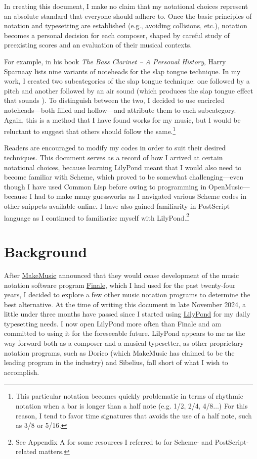 In creating this document, I make no claim that my notational choices represent an absolute standard that everyone should adhere to. Once the basic principles of notation and typesetting are established (e.g., avoiding collisions, etc.), notation becomes a personal decision for each composer, shaped by careful study of preexisting scores and an evaluation of their musical contexts. 

For example, in his book \textit{The Bass Clarinet – A Personal History}, Harry Sparnaay lists nine variants of noteheads for the slap tongue technique.\autocite[66]{HS2012} In my work, I created two subcategories of the slap tongue technique: one followed by a pitch and another followed by an air sound (which produces the slap tongue effect that sounds ). To distinguish between the two, I decided to use encircled noteheads—both filled and hollow—and attribute them to each subcategory. Again, this is a method that I have found works for my music, but I would be reluctant to suggest that others should follow the same.\footnote{This particular notation becomes quickly problematic in terms of rhythmic notation when a bar is longer than a half note (e.g. 1/2, 2/4, 4/8...) For this reason, I tend to favor time signatures that avoids the use of a half note, such as 3/8 or 5/16.} 

Readers are encouraged to modify my codes in order to suit their desired techniques. This document serves as a record of how I arrived at certain notational choices, because learning LilyPond meant that I would also need to become familiar with Scheme, which proved to be somewhat challenging—even though I have used Common Lisp before owing to programming in OpenMusic—because I had to make many guessworks as I navigated various Scheme codes in other snippets available online. I have also gained familiarity in PostScript language as I continued to familiarize myself with LilyPond.\footnote{See Appendix A for some resources I referred to for Scheme- and PostScript-related matters.}


\section{Background}

After \href{https://www.makemusic.com/}{MakeMusic} announced that they would cease development of the music notation software program \href{https://www.finalemusic.com/}{Finale}, which I had used for the past twenty-four years, I decided to explore a few other music notation programs to determine the best alternative. At the time of writing this document in late November 2024, a little under three months have passed since I started using \href{https://lilypond.org/}{LilyPond} for my daily typesetting needs. I now open LilyPond more often than Finale and am committed to using it for the foreseeable future. LilyPond appears to me as the way forward both as a composer and a musical typesetter, as other proprietary notation programs, such as Dorico (which MakeMusic has claimed to be the leading program in the industry) and Sibelius, fall short of what I wish to accomplish. 

